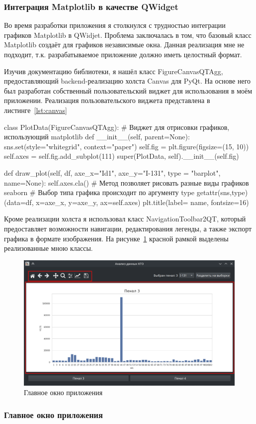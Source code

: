 \subsubsection{Интеграция Matplotlib в качестве QWidget}

Во время разработки приложения я столкнулся с трудностью интеграции графиков Matplotlib в QWidjet. Проблема заключалась в том, что базовый класс Matplotlib создаёт для графиков независимые окна. Данная реализация мне не подходит, т.к. разрабатываемое приложение должно иметь целостный формат.

Изучив документацию библиотеки, я нашёл класс FigureCanvasQTAgg, предоставляющий backend-реализацию холста Canvas для PyQt. На основе него был разработан собственный пользовательский виджет для использования в моём приложении. Реализация пользовательского виджета представлена в листинге~\ref{lst:canvas}

\begin{flushleft}
 \label{lst:canvas}
\begin{MyCodes}
class PlotData(FigureCanvasQTAgg): 
	# Виджет для отрисовки графиков, использующий matplotlib
	def __init__(self, parent=None):
		sns.set(style="whitegrid", context="paper")
		self.fig = plt.figure(figsize=(15, 10))
		self.axes = self.fig.add_subplot(111)
		super(PlotData, self).__init__(self.fig)
	
	def draw_plot(self, df, axe_x="Id1",
			axe_y="I-131", type = "barplot", name=None):
		self.axes.cla()
		# Метод позволяет рисовать разные виды графиков seaborn
		# Выбор типа графика происходит по аргументу type
		getattr(sns,type)(data=df, x=axe_x, y=axe_y, ax=self.axes)
		plt.title(label= name, fontsize=16)
\end{MyCodes}
\end{flushleft}

Кроме реализации холста я использовал класс NavigationToolbar2QT, который предоставляет возможности навигации, редактирования легенды, а также экспорт графика в формате изображения. На рисунке~\ref{fig:ris8} красной рамкой выделены реализованные мною классы.

\begin{figure}[H]
	\centering
	\includegraphics[width=0.96\linewidth]{pics/ris8} %
	\caption{Главное окно приложения}
	\label{fig:ris8} %
\end{figure}

\subsubsection{Главное окно приложения}


